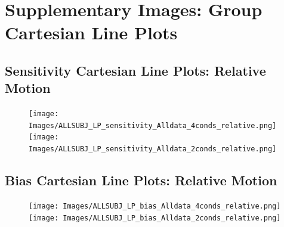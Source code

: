 \documentclass[11pt]{article} %
\begin{document}
\section{Supplementary Images: Group Cartesian Line Plots} 
\subsection{Sensitivity Cartesian Line Plots: Relative Motion}
\begin{figure}[H]
\centering %
\texttt{[image: Images/ALLSUBJ\_LP\_sensitivity\_Alldata\_4conds\_relative.png]}
\texttt{[image: Images/ALLSUBJ\_LP\_sensitivity\_Alldata\_2conds\_relative.png]}
\end{figure}
\subsection{Bias Cartesian Line Plots: Relative Motion}
\begin{figure}[H]
\centering %
\texttt{[image: Images/ALLSUBJ\_LP\_bias\_Alldata\_4conds\_relative.png]}
\texttt{[image: Images/ALLSUBJ\_LP\_bias\_Alldata\_2conds\_relative.png]}
\end{figure}

\newpage
\end{document}
